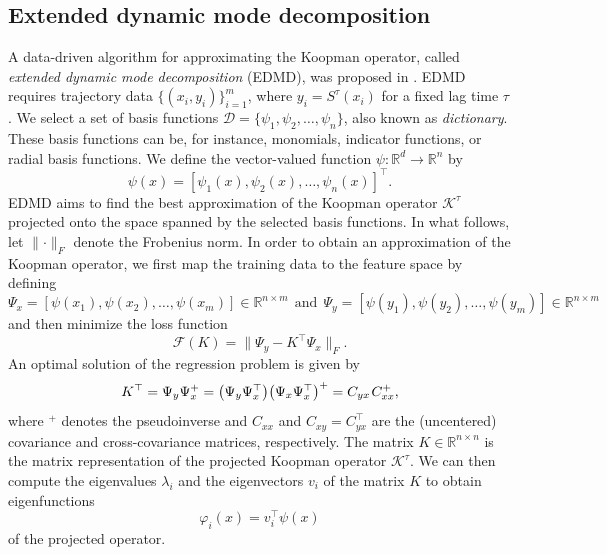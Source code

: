 \documentclass
[
    a4paper,
    DIV=11,
    abstract=true,
    11pt,
]
{scrartcl}
\newcommand{\R}{\mathbb{R}}                                      %
\newcommand{\ts}{\hspace*{0.1em}}                                %
\theoremstyle{definition}
\begin{document}
\subsection{Extended dynamic mode decomposition}

A data-driven algorithm for approximating the Koopman operator, called \emph{extended dynamic mode decomposition} (EDMD), was proposed in \cite{williams2015data}. EDMD requires trajectory data $ \{(x_i, y_i)\}_{i=1}^m $, where $ y_i = S^\tau(x_i) $ for a fixed lag time $ \tau $. We select a set of basis functions $\mathcal{D} = \{\psi_1, \psi_2, \dots, \psi_n \} $, also known as \emph{dictionary}. These basis functions can be, for instance, monomials, indicator functions, or radial basis functions. We define the vector-valued function $ \psi \colon \R^d \rightarrow \R^n $ by
\begin{equation*}
    \psi(x) = [\psi_1(x), \psi_2(x), \dots, \psi_n(x)]^\top.
\end{equation*}
EDMD aims to find the best approximation of the Koopman operator $ \mathcal{K}^\tau $ projected onto the space spanned by the selected basis functions. In what follows, let $ \lVert\cdot\rVert_F $ denote the Frobenius norm. In order to obtain an approximation of the Koopman operator, we first map the training data to the feature space by defining
\begin{equation*}
    \Psi_x = [\psi(x_{1}),\psi(x_{2}),\ldots,\psi(x_{m})] \in \R^{n \times m}
    ~~ \text{and} ~~
    \Psi_y = [\psi(y_{1}),\psi(y_{2}),\ldots,\psi(y_{m})] \in \R^{n \times m}
\end{equation*}
and then minimize the loss function
\begin{equation*}
    \mathcal{F}(K) = \big \|\Psi_y - K^\top \Psi_x\big \|_F.
\end{equation*}
An optimal solution of the regression problem is given by
\begin{equation*}
    K^\top = \Psi_y \Psi_x^+ = \big(\Psi_y \Psi_x^\top\big) \big(\Psi_x \Psi_x^\top\big)^+ = C_{yx} \ts C_{xx}^+,
\end{equation*}
where $ ^+ $ denotes the pseudoinverse and $ C_{xx} $ and $ C_{xy} = C_{yx}^\top $ are the (uncentered) covariance and cross-covariance matrices, respectively. The matrix $ K \in \R^{n \times n} $ is the matrix representation of the projected Koopman operator $ \mathcal{K}^\tau $. We can then compute the eigenvalues $ \lambda_i $ and the eigenvectors $ v_i $ of the matrix $ K $ to obtain eigenfunctions
\begin{equation*}
    \varphi_i(x) = v_i^{\top}\psi(x)
\end{equation*}
of the projected operator.
\end{document}
